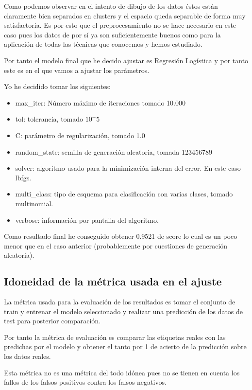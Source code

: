 \documentclass[12pt,a4paper]{article}
\begin{document}
Como podemos observar en el intento de dibujo de los datos éstos están claramente bien separados en clusters y el espacio queda separable de forma muy satisfactoria. Es por esto que el preprocesamiento no se hace necesario en este caso pues los datos de por sí ya son suficientemente buenos como para la aplicación de todas las técnicas que conocemos y hemos estudiado.

Por tanto el modelo final que he decido ajustar es Regresión Logística y por tanto este es en el que vamos a ajustar los parámetros.

Yo he decidido tomar los siguientes:

\begin{itemize}
	\item max\_iter: Número máximo de iteraciones tomado 10.000
	\item tol: tolerancia, tomado $10^-5$
	\item C: parámetro de regularización, tomado 1.0
	\item random\_state: semilla de generación aleatoria, tomada 123456789
	\item solver: algoritmo usado para la minimización interna del error. En este caso lbfgs.
	\item multi\_class: tipo de esquema para clasificación con varias clases, tomado multinomial.
	\item verbose: información por pantalla del algoritmo.
\end{itemize}

Como resultado final he conseguido obtener 0.9521 de score lo cual es un poco menor que en el caso anterior (probablemente por cuestiones de generación aleatoria). 

\subsection{Idoneidad de la métrica usada en el ajuste}

La métrica usada para la evaluación de los resultados es tomar el conjunto de train y entrenar el modelo seleccionado y realizar una predicción de los datos de test para posterior comparación. 

Por tanto la métrica de evaluación es comparar las etiquetas reales con las predichas por el modelo y obtener el tanto por 1 de acierto de la predicción sobre los datos reales.

Esta métrica no es una métrica del todo idónea pues no se tienen en cuenta los fallos de los falsos positivos contra los falsos negativos.
\end{document}
